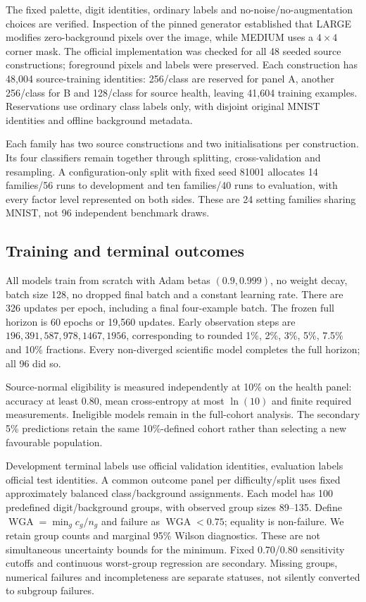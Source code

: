 The fixed palette, digit identities, ordinary labels and no-noise/no-augmentation choices are verified. Inspection of the pinned generator established that LARGE modifies zero-background pixels over the image, while MEDIUM uses a $4\times4$ corner mask. The official implementation was checked for all 48 seeded source constructions; foreground pixels and labels were preserved. Each construction has 48,004 source-training identities: 256/class are reserved for panel A, another 256/class for B and 128/class for source health, leaving 41,604 training examples. Reservations use ordinary class labels only, with disjoint original MNIST identities and offline background metadata.

Each family has two source constructions and two initialisations per construction. Its four classifiers remain together through splitting, cross-validation and resampling. A configuration-only split with fixed seed 81001 allocates 14 families/56 runs to development and ten families/40 runs to evaluation, with every factor level represented on both sides. These are 24 setting families sharing MNIST, not 96 independent benchmark draws.

\subsection{Training and terminal outcomes}
All models train from scratch with Adam betas $(0.9,0.999)$, no weight decay, batch size 128, no dropped final batch and a constant learning rate. There are 326 updates per epoch, including a final four-example batch. The frozen full horizon is 60 epochs or 19,560 updates. Early observation steps are $196,391,587,978,1467,1956$, corresponding to rounded 1\%, 2\%, 3\%, 5\%, 7.5\% and 10\% fractions. Every non-diverged scientific model completes the full horizon; all 96 did so.

Source-normal eligibility is measured independently at 10\% on the health panel: accuracy at least $0.80$, mean cross-entropy at most $\ln(10)$ and finite required measurements. Ineligible models remain in the full-cohort analysis. The secondary 5\% predictions retain the same 10\%-defined cohort rather than selecting a new favourable population.

Development terminal labels use official validation identities, evaluation labels official test identities. A common outcome panel per difficulty/split uses fixed approximately balanced class/background assignments. Each model has 100 predefined digit/background groups, with observed group sizes 89--135. Define $\operatorname{WGA}=\min_g c_g/n_g$ and failure as $\operatorname{WGA}<0.75$; equality is non-failure. We retain group counts and marginal 95\% Wilson diagnostics. These are not simultaneous uncertainty bounds for the minimum. Fixed 0.70/0.80 sensitivity cutoffs and continuous worst-group regression are secondary. Missing groups, numerical failures and incompleteness are separate statuses, not silently converted to subgroup failures.

